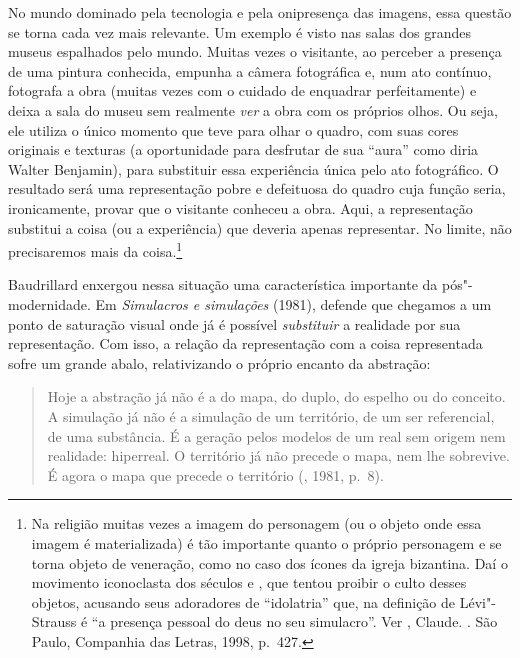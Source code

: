 No mundo dominado pela tecnologia e pela onipresença das imagens, essa
questão se torna cada vez mais relevante. Um exemplo é visto nas salas
dos grandes museus espalhados pelo mundo. Muitas vezes o visitante, ao
perceber a presença de uma pintura conhecida, empunha a câmera
fotográfica e, num ato contínuo, fotografa a obra (muitas vezes com o
cuidado de enquadrar perfeitamente) e deixa a sala do museu sem
realmente \emph{ver} a obra com os próprios olhos. Ou seja, ele utiliza
o único momento que teve para olhar o quadro, com suas cores originais e
texturas (a oportunidade para desfrutar de sua ``aura'' como diria
Walter Benjamin), para substituir essa experiência única pelo ato
fotográfico. O resultado será uma representação pobre e defeituosa do
quadro cuja função seria, ironicamente, provar que o visitante conheceu
a obra. Aqui, a representação substitui a coisa (ou a experiência) que
deveria apenas representar. No limite, não precisaremos mais da
coisa.\footnote{Na religião muitas vezes a imagem do personagem (ou o
  objeto onde essa imagem é materializada) é tão importante quanto o
  próprio personagem e se torna objeto de veneração, como no caso dos
  ícones da igreja bizantina. Daí o movimento iconoclasta dos séculos
   e , que tentou proibir o culto desses objetos, acusando seus
  adoradores de ``idolatria'' que, na definição de Lévi"-Strauss é ``a
  presença pessoal do deus no seu simulacro''. Ver , Claude.
  {}. São Paulo, Companhia das Letras, 1998, p.~427.}

Baudrillard enxergou nessa situação
uma característica importante da pós"-modernidade. Em \emph{Simulacros e
simulações} (1981), defende que chegamos a um ponto de saturação visual
onde já é possível \emph{substituir} a realidade por sua representação. Com
isso, a relação da representação com a coisa representada sofre um
grande abalo, relativizando o próprio encanto da abstração:

\begin{quote}
Hoje a abstração já não é a do mapa, do duplo, do espelho ou do
conceito. A simulação já não é a simulação de um território, de um ser
referencial, de uma substância. É a geração pelos modelos de um real sem
origem nem realidade: hiperreal. O território já não precede o mapa,
nem lhe sobrevive. É agora o mapa que precede o território (,
1981, p.~8).
\end{quote}

